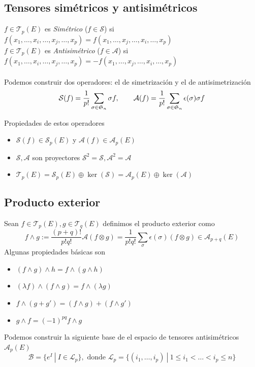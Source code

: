 \documentclass[leqno]{article}
\newcommand{\T}{\mathcal{T}}
\newcommand{\A}{\mathcal{A}}
\renewcommand{\S}{\mathcal{S}}
\newcommand{\st}{\ | \ }
\renewcommand{\A}{\mathcal{A}}
\begin{document}
\subsection{Tensores simétricos y antisimétricos}
$f\in\T_p(E)$ es \textit{Simétrico} ($f\in \S$) si $f(x_1, \ldots, x_i, \ldots, x_j, \ldots, x_p) = f(x_1, \ldots, x_j, \ldots, x_i, \ldots, x_p)$ \\
$f\in\T_p(E)$ es \textit{Antisimétrico} ($f\in \A$) si $f(x_1, \ldots, x_i, \ldots, x_j, \ldots, x_p) = -f(x_1, \ldots, x_j, \ldots, x_i, \ldots, x_p)$ \\
\\
Podemos construir dos operadores: el de simetrización y el de antisimetrización
$$
\S(f) = \frac{1}{p!} \sum_{\sigma \in \frak{S}_n} \sigma f, \qquad \A(f) = \frac{1}{p!} \sum_{\sigma \in \frak{S}_n} \epsilon(\sigma)\sigma f
$$

Propiedades de estos operadores
\begin{itemize}
    \item $\S(f)\in \S_p(E)$ y $\A(f)\in \A_p(E)$
    \item $\S, \A$ son proyectores $\S^2=\S,  \A^2=\A$
    \item $\T_p(E)=\S_p(E)\oplus \ker(\S) = \A_p(E)\oplus \ker(\A)$
\end{itemize}

\subsection{Producto exterior}
Sean $f\in\T_p(E), g\in \T_q(E) $ definimos el producto exterior como
$$
f\wedge g := \frac{(p+q)!}{p!q!}\A(f\otimes g) = \frac{1}{p!q!}\sum_\sigma \epsilon(\sigma)(f\otimes g) \in \A_{p+q}(E)
$$
Algunas propiedades básicas son
\begin{itemize}
    \item $(f\wedge g)\wedge h=f\wedge(g\wedge h)$
    \item $(\lambda f)\wedge(f\wedge g) = f\wedge(\lambda g)$
    \item $f\wedge(g+g') = (f\wedge g) + (f\wedge g')$
    \item $g\wedge f = (-1)^{pq} f\wedge g$
\end{itemize}
Podemos construir la siguiente base de el espacio de tensores antisimétricos $\A_p(E)$
$$
\mathcal{B} = \{ e^I \st I\in \mathcal{L}_p \}, \text{ donde } \mathcal{L}_p = \{ (i_1, \dots, i_p) \st 1\leq i_1 < \ldots <i_p\leq n \}
$$
\end{document}
